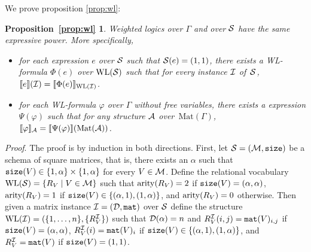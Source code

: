 \newtheorem*{WL}{Proposition~\ref{prop:wl}}

We prove proposition \ref{prop:wl}:

\begin{WL}
  Weighted logics over $\Gamma$ and \langprod over $\mathcal{S}$ have the same expressive power. More specifically,
  \begin{itemize}
  	\item for each \langprod expression $e$ over $\mathcal{S}$ such that $\mathcal{S}(e)=(1,1)$, there exists a WL-formula $\Phi(e)$ over $\text{WL}(\mathcal{S})$ such that for every instance $\mathcal{I}$ of~$\mathcal{S}$, 
  	$
  	\llbracket e \rrbracket(\mathcal{I}) = \llbracket \Phi(e) \rrbracket_{\text{WL}(\mathcal{I})}
  	$.
  	\item for each WL-formula $\varphi$ over $\Gamma$ without free variables, there exists a \langprod expression $\Psi(\varphi)$ such that for any structure $\mathcal{A}$ over~$\text{Mat}(\Gamma)$,
  	$
  	\llbracket \varphi \rrbracket_{\mathcal{A}}=\llbracket \Psi(\varphi) \rrbracket(\text{Mat}(\mathcal{A}))
  	$.
  \end{itemize}	
\end{WL}

\textit{Proof}. The proof is by induction in both directions. 
First, let $\mathcal{S}=(\mathcal{M},\texttt{size})$ be a schema of square matrices, that is, there exists an $\alpha$ such 
that $\texttt{size}(V) \in \{1, \alpha\} \times \{1,\alpha\}$ for every $V \in \mathcal{M}$.
Define the relational vocabulary $\text{WL}(\mathcal{S}) = \{R_V \mid V \in \mathcal{M}\}$ such that $\operatorname{arity}(R_V) = 2$ 
if $\texttt{size}(V) = (\alpha, \alpha)$, $\operatorname{arity}(R_V) = 1$ if $\texttt{size}(V) \in \{(\alpha,1), (1,\alpha)\}$, and 
$\operatorname{arity}(R_V) = 0$ otherwise.
Then given a matrix instance $\mathcal{I} = (\mathcal{D},\texttt{mat})$ over $\mathcal{S}$ define the structure 
$\text{WL}(\mathcal{I}) = (\{1, \ldots, n\}, \{R_V^{\mathcal{I}}\} )$ such that $\mathcal{D}(\alpha) = n$ and 
$R_V^{\mathcal{I}}(i, j) = \texttt{mat}(V)_{i,j}$ if $\texttt{size}(V) = (\alpha, \alpha)$, $R_V^{\mathcal{I}}(i) = \texttt{mat}(V)_{i}$ 
if $\texttt{size}(V) \in \{(\alpha,1), (1,\alpha)\}$, and $R_V^{\mathcal{I}} = \texttt{mat}(V)$ if $\texttt{size}(V) = (1,1)$.

